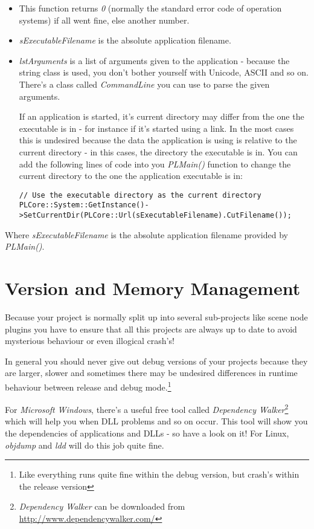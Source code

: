 \begin{itemize}
\item{This function returns \emph{0} (normally the standard error code of operation systems) if all went fine, else another number.}
\item{\emph{sExecutableFilename} is the absolute application filename.}
\item{\emph{lstArguments} is a list of arguments given to the application - because the string class is used, you don't bother yourself with Unicode, \ac{ASCII} and so on. There's a class called \emph{CommandLine} you can use to parse the given arguments.}

If an application is started, it's current directory may differ from the one the executable is in - for instance if it's started using a link. In the most cases this is undesired because the data the application is using is relative to the current directory - in this cases, the directory the executable is in. You can add the following lines of code into you \emph{PLMain()} function to change the current directory to the one the application executable is in:

\begin{lstlisting}[caption=Set current directory example]
// Use the executable directory as the current directory
PLCore::System::GetInstance()->SetCurrentDir(PLCore::Url(sExecutableFilename).CutFilename());
\end{lstlisting}
\end{itemize}

Where \emph{sExecutableFilename} is the absolute application filename provided by \emph{PLMain()}.




\section{Version and Memory Management}
Because your project is normally split up into several sub-projects like scene node plugins you have to ensure that all this projects are always up to date to avoid mysterious behaviour or even illogical crash's!

In general you should never give out debug versions of your projects because they are larger, slower and sometimes there may be undesired differences in runtime behaviour between release and debug mode.\footnote{Like everything runs quite fine within the debug version, but crash's within the release version}

For \emph{Microsoft Windows}, there's a useful free tool called \emph{Dependency Walker}\footnote{\emph{Dependency Walker} can be downloaded from \url{http://www.dependencywalker.com/}} which will help you when \ac{DLL} problems and so on occur. This tool will show you the dependencies of applications and \ac{DLL}s - so have a look on it! For Linux, \emph{objdump} and \emph{ldd} will do this job quite fine.

